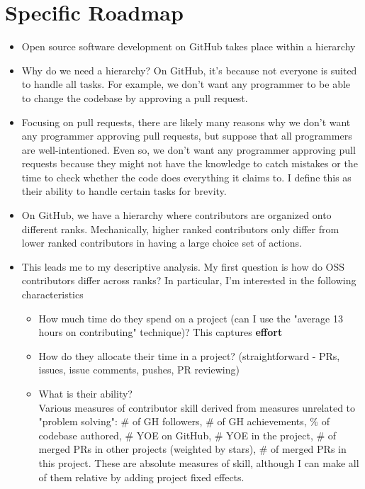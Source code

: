 \documentclass[source/paper/main.tex]{subfiles}
\begin{document}
\section{Specific Roadmap}
\begin{itemize}
    \item Open source software development on GitHub takes place within a hierarchy 
    \item Why do we need a hierarchy? On GitHub, it's because not everyone is suited to handle all tasks. For example, we don't want any programmer to be able to change the codebase by approving a pull request.
    \item Focusing on pull requests, there are likely many reasons why we don't want any programmer approving pull requests, but suppose that all programmers are well-intentioned. Even so, we don't want any programmer approving pull requests because they might not have the knowledge to catch mistakes or the time to check whether the code does everything it claims to. I define this as their ability to handle certain tasks for brevity. 
    \item On GitHub, we have a hierarchy where contributors are organized onto different ranks. Mechanically, higher ranked contributors only differ from lower ranked contributors in having a large choice set of actions. 
    \item This leads me to my descriptive analysis. My first question is how do OSS contributors differ across ranks? In particular, I'm interested in the following characteristics
    \begin{itemize}
        \item How much time do they spend on a project (can I use the "average 13 hours on contributing" technique)? This captures \textbf{effort}
        \item How do they allocate their time in a project? (straightforward - PRs, issues, issue comments, pushes, PR reviewing)
        \item What is their ability?   \\
        Various measures of contributor skill derived from measures unrelated to "problem solving": \# of GH followers, \# of GH achievements, \% of codebase authored, \# YOE on GitHub, \# YOE in the project, \# of merged PRs in other projects (weighted by stars), \# of merged PRs in this project. These are absolute measures of skill, although I can make all of them relative by adding project fixed effects.\\

\end{itemize}
\end{itemize}
\end{document}
